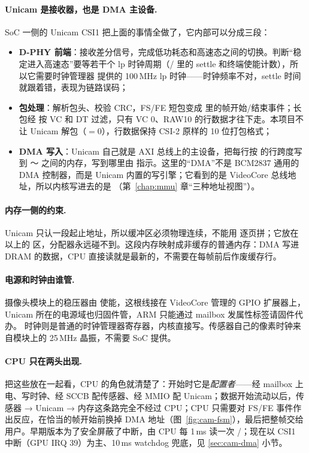 \paragraph{Unicam 是接收器，也是 DMA 主设备.} SoC 一侧的 Unicam CSI1 把上面的事情全做了，它内部可以分成三段：
\begin{itemize}
  \item \textbf{D-PHY 前端}：接收差分信号，完成低功耗态和高速态之间的切换。判断“稳定进入高速态”要等若干个 lp 时钟周期（/ 里的 settle 和终端使能计数），所以它需要时钟管理器  提供的 100\,MHz lp 时钟——时钟频率不对，settle 时间就跟着错，表现为链路误码；
  \item \textbf{包处理}：解析包头、校验 CRC，FS/FE 短包变成  里的帧开始/结束事件；长包经  按 VC 和 DT 过滤，只有 VC 0、RAW10 的行数据才往下走。本项目不让 Unicam 解包（$=0$），行数据保持 CSI-2 原样的 10 位打包格式；
  \item \textbf{DMA 写入}：Unicam 自己就是 AXI 总线上的主设备，把每行按  的行跨度写到 ～ 之间的内存，写到哪里由  指示。这里的“DMA”不是 BCM2837 通用的 DMA 控制器，而是 Unicam 内置的写引擎；它看到的是 VideoCore 总线地址，所以内核写进去的是 （第~\ref{chap:mmu} 章“三种地址视图”）。
\end{itemize}

\paragraph{内存一侧的约束.} Unicam 只认一段起止地址，所以缓冲区必须物理连续，不能用  逐页拼；它放在  以上的  区，分配器永远碰不到。这段内存映射成非缓存的普通内存：DMA 写进 DRAM 的数据，CPU 直接读就是最新的，不需要在每帧前后作废缓存行。

\paragraph{电源和时钟由谁管.} 摄像头模块上的稳压器由  使能，这根线接在 VideoCore 管理的 GPIO 扩展器上，Unicam 所在的电源域也归固件管，ARM 只能通过 mailbox 发属性标签请固件代办。 时钟则是普通的时钟管理器寄存器，内核直接写。传感器自己的像素时钟来自模块上的 25\,MHz 晶振，不需要 SoC 提供。

\paragraph{CPU 只在两头出现.} 把这些放在一起看，CPU 的角色就清楚了：开始时它是\emph{配置者}——经 mailbox 上电、写时钟、经 SCCB 配传感器、经 MMIO 配 Unicam；数据开始流动以后，传感器 → Unicam → 内存这条路完全不经过 CPU；CPU 只需要对 FS/FE 事件作出反应，在恰当的帧开始前换掉 DMA 地址（图~\ref{fig:cam-fsm}），最后把整帧交给用户。早期版本为了安全屏蔽了中断，由 CPU 每 1\,ms 读一次 /；现在以 CSI1 中断（GPU IRQ 39）为主、10\,ms watchdog 兜底，见 \ref{sec:cam-dma} 小节。

